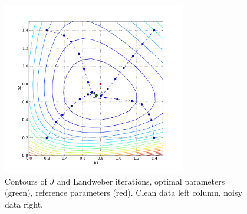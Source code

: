 \begin{figure}
\begin{center}
    \includegraphics[width=8cm]{chapters/schroll/pdf/b1b2scan4-5.pdf}
    \end{center}
  \caption{Contours of $J$ and Landweber iterations, optimal parameters (green), reference parameters (red).
   Clean data left column, noisy data right. \label{fig2}}
\end{figure}

